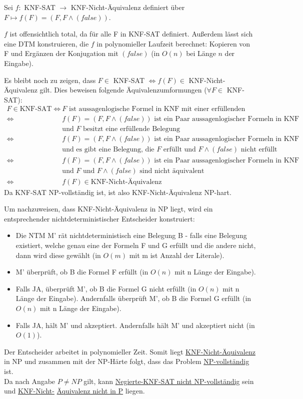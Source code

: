 Sei $f:$ KNF-SAT $\rightarrow$ KNF-Nicht-Äquivalenz definiert über $F\mapsto f(F)=(F,F\wedge (false))$.

$f$ ist offensichtlich total, da für alle F in KNF-SAT definiert. Außerdem lässt sich eine DTM konstruieren, die $f$ in polynomieller Laufzeit berechnet: Kopieren von F und Ergänzen der Konjugation mit $(false)$ (in \( O(n) \) bei Länge \( n \) der Eingabe).

Es bleibt noch zu zeigen, dass $F \in $ KNF-SAT $ \Leftrightarrow f(F) \in$ KNF-Nicht-Äquivalenz gilt. Dies beweisen folgende Äquivalenzumformungen ($\forall F \in$ KNF-SAT):
\begin{align*}
	F \in \text{KNF-SAT} \Longleftrightarrow\ & F\text{ ist aussagenlogische Formel in KNF mit einer erfüllenden Belegung}\\
	\Leftrightarrow\ & f(F)=(F,F\wedge (false))\text{ ist ein Paar aussagenlogischer Formeln in KNF }\\
	& \text{und } F \text{ besitzt eine erfüllende Belegung}\\
	\Leftrightarrow\ & f(F)=(F,F\wedge (false))\text{ ist ein Paar aussagenlogischer Formeln in KNF }\\
	& \text{und es gibt eine Belegung, die } F \text{ erfüllt und } F\wedge (false) \text{ nicht erfüllt}\\
	\Leftrightarrow\ & f(F)=(F,F\wedge (false))\text{ ist ein Paar aussagenlogischer Formeln in KNF }\\
	& \text{und } F \text{ und } F\wedge (false) \text{ sind nicht äquivalent}\\
	\Leftrightarrow\ & f(F) \in \text{KNF-Nicht-Äquivalenz}
\end{align*}
Da KNF-SAT NP-vollständig ist, ist also KNF-Nicht-Äquivalenz NP-hart.

Um nachzuweisen, dass KNF-Nicht-Äquivalenz in NP liegt, wird ein entsprechender nichtdeterministischer Entscheider konstruiert:
\begin{itemize}
	\item Die NTM M' rät nichtdeterministisch eine Belegung B - falls eine Belegung existiert, welche genau eine der Formeln F und G erfüllt und die andere nicht, dann wird diese gewählt (in $O(m)$ mit m ist Anzahl der Literale).
	\item M' überprüft, ob B die Formel F erfüllt (in $O(n)$ mit n Länge der Eingabe).
	\item Falls JA, überprüft M', ob B die Formel G nicht erfüllt (in $O(n)$ mit n Länge der Eingabe). Andernfalls überprüft M', ob B die Formel G erfüllt (in $O(n)$ mit n Länge der Eingabe).
	\item Falls JA, hält M' und akzeptiert. Andernfalls hält M' und akzeptiert nicht (in $O(1)$).
\end{itemize}

Der Entscheider arbeitet in polynomieller Zeit. Somit liegt \underline{KNF-Nicht-Äquivalenz} in NP und zusammen mit der NP-Härte folgt, dass das Problem \underline{NP-vollständig} ist.\\

Da nach Angabe $P\neq NP$ gilt, kann \underline{Negierte-KNF-SAT nicht NP-vollständig} sein und \underline{KNF-Nicht-}
\underline{Äquivalenz nicht in P} liegen.